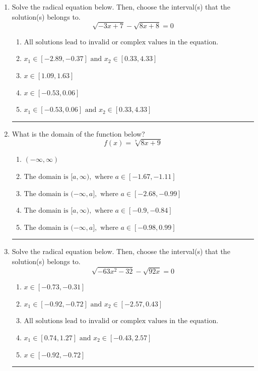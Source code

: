 \documentclass[14pt]{extbook}
\newcommand{\litem}[1]{\item#1\hspace*{-1cm}\rule{\textwidth}{0.4pt}}
\begin{document}
\begin{enumerate}
\litem{
Solve the radical equation below. Then, choose the interval(s) that the solution(s) belongs to.\[ \sqrt{-3 x + 7} - \sqrt{8 x + 8} = 0 \]\begin{enumerate}[label=\Alph*.]
\item \( \text{All solutions lead to invalid or complex values in the equation.} \)
\item \( x_1 \in [-2.89, -0.37] \text{ and } x_2 \in [0.33,4.33] \)
\item \( x \in [1.09,1.63] \)
\item \( x \in [-0.53,0.06] \)
\item \( x_1 \in [-0.53, 0.06] \text{ and } x_2 \in [0.33,4.33] \)

\end{enumerate} }
\litem{
What is the domain of the function below?\[ f(x) = \sqrt[7]{8 x + 9} \]\begin{enumerate}[label=\Alph*.]
\item \( (-\infty, \infty) \)
\item \( \text{The domain is } [a, \infty), \text{   where } a \in [-1.67, -1.11] \)
\item \( \text{The domain is } (-\infty, a], \text{   where } a \in [-2.68, -0.99] \)
\item \( \text{The domain is } [a, \infty), \text{   where } a \in [-0.9, -0.84] \)
\item \( \text{The domain is } (-\infty, a], \text{   where } a \in [-0.98, 0.99] \)

\end{enumerate} }
\litem{
Solve the radical equation below. Then, choose the interval(s) that the solution(s) belongs to.\[ \sqrt{-63 x^2 - 32} - \sqrt{92 x} = 0 \]\begin{enumerate}[label=\Alph*.]
\item \( x \in [-0.73,-0.31] \)
\item \( x_1 \in [-0.92, -0.72] \text{ and } x_2 \in [-2.57,0.43] \)
\item \( \text{All solutions lead to invalid or complex values in the equation.} \)
\item \( x_1 \in [0.74, 1.27] \text{ and } x_2 \in [-0.43,2.57] \)
\item \( x \in [-0.92,-0.72] \)


\end{enumerate}}
\end{enumerate}
\end{document}
